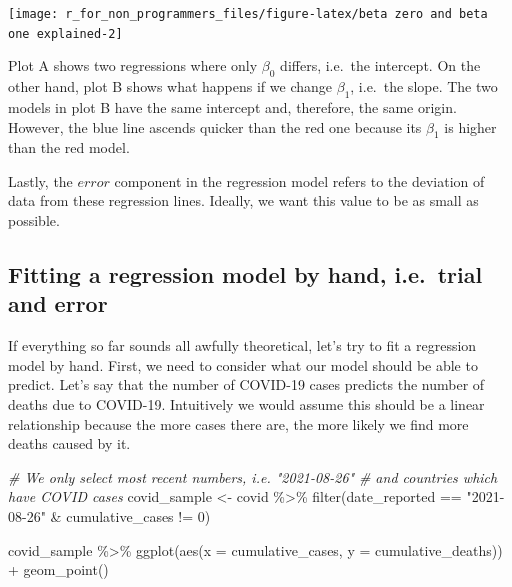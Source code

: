 \documentclass[
]{book}
\newenvironment{Shaded}{\begin{snugshade}}{\end{snugshade}}
\newcommand{\AttributeTok}[1]{\textcolor[rgb]{0.77,0.63,0.00}{#1}}
\newcommand{\CommentTok}[1]{\textcolor[rgb]{0.56,0.35,0.01}{\textit{#1}}}
\newcommand{\DecValTok}[1]{\textcolor[rgb]{0.00,0.00,0.81}{#1}}
\newcommand{\FunctionTok}[1]{\textcolor[rgb]{0.00,0.00,0.00}{#1}}
\newcommand{\NormalTok}[1]{#1}
\newcommand{\OtherTok}[1]{\textcolor[rgb]{0.56,0.35,0.01}{#1}}
\newcommand{\SpecialCharTok}[1]{\textcolor[rgb]{0.00,0.00,0.00}{#1}}
\newcommand{\StringTok}[1]{\textcolor[rgb]{0.31,0.60,0.02}{#1}}
\begin{document}
\begin{center}\texttt{[image: r\_for\_non\_programmers\_files/figure-latex/beta zero and beta one explained-2]} \end{center}

Plot A shows two regressions where only \(\beta_0\) differs, i.e.~the intercept. On the other hand, plot B shows what happens if we change \(\beta_1\), i.e.~the slope. The two models in plot B have the same intercept and, therefore, the same origin. However, the blue line ascends quicker than the red one because its \(\beta_1\) is higher than the red model.

Lastly, the \(error\) component in the regression model refers to the deviation of data from these regression lines. Ideally, we want this value to be as small as possible.

\hypertarget{fitting-a-regression-model-by-hand}{%
\subsection{Fitting a regression model by hand, i.e.~trial and error}\label{fitting-a-regression-model-by-hand}}

If everything so far sounds all awfully theoretical, let's try to fit a regression model by hand. First, we need to consider what our model should be able to predict. Let's say that the number of COVID-19 cases predicts the number of deaths due to COVID-19. Intuitively we would assume this should be a linear relationship because the more cases there are, the more likely we find more deaths caused by it.

\begin{Shaded}
\begin{Highlighting}[]
\CommentTok{\# We only select most recent numbers, i.e. "2021{-}08{-}26"}
\CommentTok{\# and countries which have COVID cases}
\NormalTok{covid\_sample }\OtherTok{\textless{}{-}}\NormalTok{ covid }\SpecialCharTok{\%\textgreater{}\%}
  \FunctionTok{filter}\NormalTok{(date\_reported }\SpecialCharTok{==} \StringTok{"2021{-}08{-}26"} \SpecialCharTok{\&}
\NormalTok{           cumulative\_cases }\SpecialCharTok{!=} \DecValTok{0}\NormalTok{)}

\NormalTok{covid\_sample }\SpecialCharTok{\%\textgreater{}\%}
  \FunctionTok{ggplot}\NormalTok{(}\FunctionTok{aes}\NormalTok{(}\AttributeTok{x =}\NormalTok{ cumulative\_cases,}
             \AttributeTok{y =}\NormalTok{ cumulative\_deaths)) }\SpecialCharTok{+}
  \FunctionTok{geom\_point}\NormalTok{()}
\end{Highlighting}
\end{Shaded}
\end{document}
